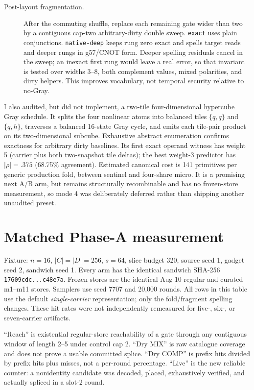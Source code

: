 \documentclass[11pt]{article}
\newcommand{\code}[1]{\texttt{#1}}
\begin{document}
\begin{description}
\item[Post-layout fragmentation.]
After the commuting shuffle, replace each remaining gate wider than two
by a contiguous cap-two arbitrary-dirty double sweep.  \code{exact} uses plain
conjunctions.  \code{native-deep} keeps rung zero exact and spells target reads
and deeper rungs in g57/CNOT form.  Deeper spelling residuals cancel in the
sweep; an inexact first rung would leave a real error, so that invariant is
tested over widths 3--8, both complement values, mixed polarities, and dirty
helpers.  This improves vocabulary, not temporal security relative to no-Gray.
\end{description}

I also audited, but did not implement, a two-tile four-dimensional hypercube
Gray schedule.  It splits the four nonlinear atoms into balanced tiles
$\{q,q\}$ and $\{q,h\}$, traverses a balanced 16-state Gray cycle, and emits
each tile-pair product on its two-dimensional subcube.  Exhaustive abstract
enumeration confirms exactness for arbitrary dirty baselines.  Its first exact
operand witness has weight 5 (carrier plus both two-snapshot tile deltas); the
best weight-3 predictor has $|\rho|=.375$ (68.75\% agreement).  Estimated
canonical cost is 141 primitives per generic production fold, between sentinel
and four-share micro.  It is a promising next A/B arm, but remains structurally
recombinable and has no frozen-store measurement, so mode 4 was deliberately
deferred rather than shipping another unaudited preset.

\section{Matched Phase-A measurement}

Fixture: $n=16$, $|C|=|D|=256$, $s=64$, slice budget 320, source seed 1,
gadget seed 2, sandwich seed 1.  Every arm has the identical sandwich SHA-256
\code{17609cdc...c48e7a}.  Frozen stores are the identical Aug-10 regular and
curated m1--m11 stores.  Samplers use seed 7707 and 20,000 rounds.
All rows in this table use the default \emph{single-carrier} representation;
only the fold/fragment spelling changes.  These hit rates were not independently
remeasured for five-, six-, or seven-carrier artifacts.

``Reach'' is existential regular-store reachability of a gate through any
contiguous window of length 2--5 under control cap 2.  ``Dry MIX'' is raw
catalogue coverage and does not prove a usable committed splice. ``Dry COMP''
is prefix hits divided by prefix hits plus misses, not a per-round percentage.
``Live'' is the new reliable counter: a nonidentity candidate was decoded,
placed, exhaustively verified, and actually spliced in a slot-2 round.
\end{document}
